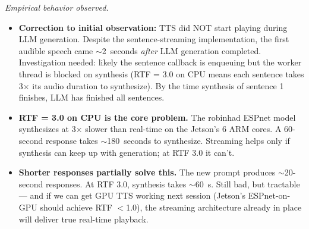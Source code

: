 \documentclass{article}
\theoremstyle{plain}
\theoremstyle{definition}
\theoremstyle{remark}
\begin{document}
\textit{Empirical behavior observed.}
\begin{itemize}
\item \textbf{Correction to initial observation:} TTS did NOT start playing during LLM generation. Despite the sentence-streaming implementation, the first audible speech came $\sim$2~seconds \textit{after} LLM generation completed. Investigation needed: likely the sentence callback is enqueuing but the worker thread is blocked on synthesis (RTF = 3.0 on CPU means each sentence takes 3$\times$ its audio duration to synthesize). By the time synthesis of sentence 1 finishes, LLM has finished all sentences.
\item \textbf{RTF = 3.0 on CPU is the core problem.} The robinhad ESPnet model synthesizes at 3$\times$ slower than real-time on the Jetson's 6 ARM cores. A 60-second response takes $\sim$180~seconds to synthesize. Streaming helps only if synthesis can keep up with generation; at RTF 3.0 it can't.
\item \textbf{Shorter responses partially solve this.} The new prompt produces $\sim$20-second responses. At RTF 3.0, synthesis takes $\sim$60~s. Still bad, but tractable --- and if we can get GPU TTS working next session (Jetson's ESPnet-on-GPU should achieve RTF $<$1.0), the streaming architecture already in place will deliver true real-time playback.
\end{itemize}
\end{document}
